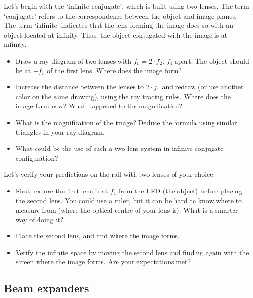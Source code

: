 \documentclass[a4paper]{report}
\begin{document}
	Let's begin with the `infinite conjugate', which is built using two lenses. 
	The term `conjugate' refers to the correspondence between the object and image planes. 
	The term `infinite' indicates that the lens forming the image does so with an object located at infinity.
	Thus, the object conjugated with the image is at infinity. 

	\begin{itemize}
		\item Draw a ray diagram of two lenses with $f_1=2 \cdot f_2$, $f_1$ apart. The object should be at $-f_1$ of the first lens. Where does the image form? 
		\item Increase the distance between the lenses to $2\cdot f_1$ and redraw (or use another color on the same drawing), using the ray tracing rules. Where does the image form now? What happened to the magnification?
		\item What is the magnification of the image? Deduce the formula using similar triangles in your ray diagram.
		\item What could be the use of such a two-lens system in infinite conjugate configuration?
	\end{itemize}

    \noindent
	Let's verify your predictions on the rail with two lenses of your choice.  
	
	\begin{itemize}    
	    \item First, ensure the first lens is at $f_1$ from the LED (the object) before placing the second lens. You could use a ruler, but it can be hard to know where to measure from (where the optical centre of your lens is). What is a smarter way of doing it?
	    \item Place the second lens, and find where the image forms.
	    \item Verify the infinite space by moving the second lens and finding again with the screen where the image forms. Are your expectations met?
	\end{itemize}


	
	
	\subsection{Beam expanders}
	\hypertarget{hintBack-expand}{}
	
\end{document}
